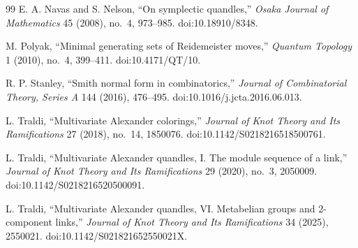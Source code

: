 \documentclass[11pt]{article}
\theoremstyle{definition}
\begin{document}
\begin{thebibliography}{99}
E. A. Navas and S. Nelson, ``On symplectic quandles,'' \emph{Osaka Journal of Mathematics} 45 (2008), no.~4, 973--985. doi:10.18910/8348.

M. Polyak, ``Minimal generating sets of Reidemeister moves,'' \emph{Quantum Topology} 1 (2010), no.~4, 399--411. doi:10.4171/QT/10.

R. P. Stanley, ``Smith normal form in combinatorics,'' \emph{Journal of Combinatorial Theory, Series A} 144 (2016), 476--495. doi:10.1016/j.jcta.2016.06.013.

L. Traldi, ``Multivariate Alexander colorings,'' \emph{Journal of Knot Theory and Its Ramifications} 27 (2018), no.~14, 1850076. doi:10.1142/S0218216518500761.

L. Traldi, ``Multivariate Alexander quandles, I. The module sequence of a link,'' \emph{Journal of Knot Theory and Its Ramifications} 29 (2020), no.~3, 2050009. doi:10.1142/S0218216520500091.

L. Traldi, ``Multivariate Alexander quandles, VI. Metabelian groups and 2-component links,'' \emph{Journal of Knot Theory and Its Ramifications} 34 (2025), 2550021. doi:10.1142/S021821652550021X.

\end{thebibliography}
\end{document}

